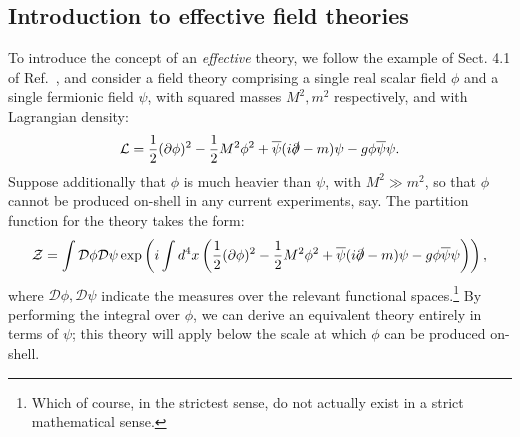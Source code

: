 \documentclass[withindex,glossary]{cam-thesis}
\begin{document}
\subsection{Introduction to effective field theories}
\label{subsec:eft_background}

To introduce the concept of an \textit{effective} theory, we follow the example of Sect. 4.1 of Ref.~\cite{Petrov:2016azi}, and consider a field theory comprising a single real scalar field $\phi$ and a single fermionic field $\psi$, with squared masses $M^2, m^2$ respectively, and with Lagrangian density:
\begin{equation}
\label{eq:yukawa}
\mathcal{L} = \frac{1}{2} (\partial \phi)^2 - \frac{1}{2} M^2 \phi^2 + \overline{\psi}(i \slashed{\partial} - m) \psi - g \phi \overline{\psi} \psi.
\end{equation}
Suppose additionally that $\phi$ is much heavier than $\psi$, with $M^2 \gg m^2$, so that $\phi$ cannot be produced on-shell in any current experiments, say. The partition function for the theory takes the form:
\begin{equation}
\label{eq:partition_function}
\mathcal{Z} = \int \mathcal{D}\phi \mathcal{D}\psi \exp\left(i \int d^4x \left( \frac{1}{2} (\partial \phi)^2 - \frac{1}{2} M^2 \phi^2 + \overline{\psi}(i \slashed{\partial} - m) \psi - g \phi \overline{\psi} \psi\right) \right),
\end{equation}
where $\mathcal{D}\phi, \mathcal{D}\psi$ indicate the measures over the relevant functional spaces.\footnote{Which of course, in the strictest sense, do not actually exist in a strict mathematical sense.} By performing the integral over $\phi$, we can derive an equivalent theory entirely in terms of $\psi$; this theory will apply below the scale at which $\phi$ can be produced on-shell. 
\end{document}
